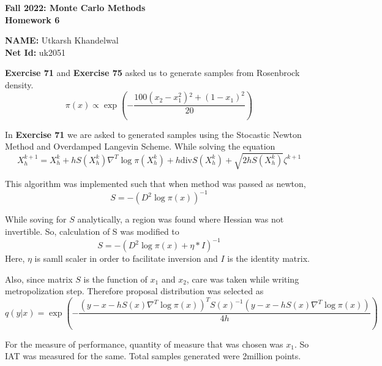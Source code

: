 \documentclass[11pt]{article}
\begin{document}
\begin{center}
\large \textbf{%
Fall 2022: Monte Carlo Methods}\\
\textbf{ Homework 6 }
\end{center}
\begin{center}
{\textbf{NAME:} Utkarsh Khandelwal\\}
{\textbf{Net Id:} uk2051}
\end{center}


\noindent \textbf{Exercise 71} and \textbf{Exercise 75} asked us to generate samples from Rosenbrock density.
$$\pi(x) \propto \exp \left(- \frac{100 (x_2 - x_1^2){^2}  + (1 - x_1)^2}{20} \right)$$

In \textbf{Exercise 71} we are asked to generated samples using the Stocastic Newton Method and Overdamped Langevin Scheme.
While solving the equation
$$
X_h^{k + 1} = X_h^{k} + h S(X_h^{k}) \nabla^T \log \pi(X_h^{k}) + h \text{div} S(X_h^{k}) + \sqrt{2 h S(X_h^{k})} \zeta^{k + 1}
$$

This algorithm was implemented such that when method was passed as newton, 
$$S = -(D^2 \log \pi(x))^{-1}$$

While soving for $S$ analytically, a region was found where Hessian was not invertible. So, calculation of S was modified to
$$S = -(D^2 \log \pi(x) + \eta * I)^{-1}$$
Here, $\eta$ is samll scaler in order to facilitate inversion and $I$ is the identity matrix.

Also, since matrix $S$ is the function of $x_1$ and $x_2$, care was taken while writing metropolization step.
Therefore proposal distribution was selected as
$$q(y |x ) = \exp\left(- \frac{ (y - x - hS(x)\nabla^T \log \pi (x) )^T S(x)^{-1} (y - x - hS(x)\nabla^T \log \pi (x) ) } {4h} \right)$$

For the measure of performance, quantity of measure that was chosen was $x_1$. So IAT was measured for the same. Total samples generated were 2million points.
\end{document}
